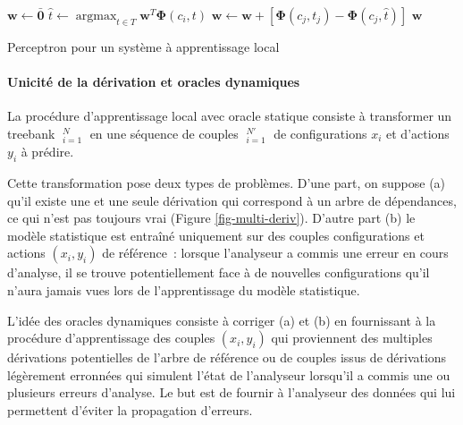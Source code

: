 \documentclass[11pt,openany]{book}
\begin{document}
\begin{algorithm}[htbp]
\begin{algorithmic}[1]
\State $\mathbf{w} \gets \bar{\mathbf{0}}$
\State
$\hat{t} \gets \mathop{\text{argmax}}_{t\in
  T}  \mathbf{w}^T \boldsymbol\Phi(c_i,t)$
     \State $\mathbf{w} \gets  \mathbf{w} +
     \left[ \boldsymbol\Phi(c_j,t_j) 
       - \boldsymbol\Phi(c_j,\hat{t})   \right]$ 
\EndIf
\EndFor
\EndFor
\State \Return $\mathbf{w}$
\EndFunction
\end{algorithmic}
\caption{\label{perceptron-AE}Perceptron pour un système à
  apprentissage local}
\end{algorithm}

\paragraph{Unicité de la dérivation et oracles dynamiques}

La procédure d'apprentissage local avec oracle statique 
consiste à transformer un treebank $\mathop{(\mathbf{x}_i,\mathbf{y}_i)}^N_{i=1}$
en une séquence de couples $\mathop{(x_i,y_i)}_{i=1}^{N'}$
de configurations $x_i$ et d'actions $y_i$ à prédire.

Cette transformation pose deux types de problèmes. D'une part, on
suppose (a) qu'il existe une et une seule dérivation qui correspond à un
arbre de dépendances, ce qui n'est pas toujours vrai (Figure \ref{fig-multi-deriv}). D'autre part (b) le modèle statistique est
entraîné uniquement sur des couples configurations et actions
$(x_i,y_i)$ de référence~: lorsque l'analyseur a commis une erreur en
cours d'analyse, il se trouve potentiellement face à de nouvelles
configurations qu'il n'aura jamais vues lors de
l'apprentissage du modèle statistique.

L'idée des oracles dynamiques consiste à corriger (a) et (b)
en  fournissant à la procédure d'apprentissage 
des couples $(x_i,y_i)$ qui proviennent des multiples dérivations
potentielles de l'arbre de référence ou de couples issus de
dérivations légèrement erronnées qui simulent l'état de l'analyseur lorsqu'il a commis
une ou plusieurs erreurs d'analyse. Le but est de fournir à l'analyseur des données qui
lui permettent d'éviter la propagation d'erreurs.
\end{document}

